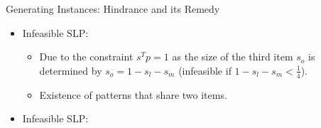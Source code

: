 \documentclass[xcolor=table]{beamer} %
\theoremstyle{definition}
\theoremstyle{plain}
\theoremstyle{remark}
\renewcommand{\a}[1]{\textcolor{dred}{#1}}
\renewcommand{\b}[1]{\textcolor{dblue}{#1}}
\begin{document}
\begin{frame}{Generating Instances: Hindrance and its Remedy}
   
   \onslide<1->{\textbf{\b{Hindrance:}}}
    \begin{itemize}
        \item<1->  Infeasible SLP: 
            \begin{itemize}
                 \item<1-> Due to the constraint \b{$s^T p = 1$} as the size of the third item $s_o$ is determined by $s_o = 1 - s_l - s_m$ \a{(infeasible if $1- s_l - s_m < \frac{1}{4}$)}.
            
                \item<2-> Existence of patterns that share two items. 
            \end{itemize}
           

    \end{itemize}
    
    \onslide<3->{\textbf{\b{Remedy:}}}
        \begin{itemize}
            \item<3-> Infeasible SLP:
                \begin{itemize}
                            
                    

\end{itemize}
\end{itemize}
\end{frame}
\end{document}

